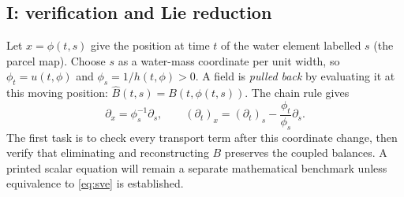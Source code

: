 \documentclass[12pt,a4paper]{article}
\begin{document}
\subsection*{I: verification and Lie reduction}

Let $x=\phi(t,s)$ give the position at time $t$ of the water element labelled $s$ (the parcel map). Choose $s$ as a water-mass coordinate per unit width, so $\phi_t=u(t,\phi)$ and $\phi_s=1/h(t,\phi)>0$. A field is \emph{pulled back} by evaluating it at this moving position: $\widehat B(t,s)=B(t,\phi(t,s))$. The chain rule gives
\begin{equation}
\partial_x=\phi_s^{-1}\partial_s,\qquad
(\partial_t)_x=(\partial_t)_s-\frac{\phi_t}{\phi_s}\partial_s.
\end{equation}
The first task is to check every transport term after this coordinate change, then verify that eliminating and reconstructing $B$ preserves the coupled balances. A printed scalar equation will remain a separate mathematical benchmark unless equivalence to \eqref{eq:sve} is established.
\end{document}
